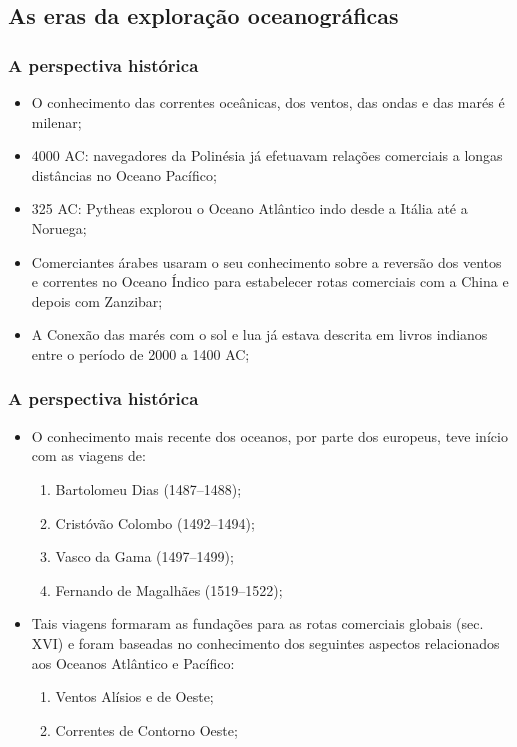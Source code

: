 \subsection{As eras da exploração oceanográficas}
\begin{frame}
\footnotesize{
    \frametitle{A perspectiva histórica}
    \begin{itemize}[<+-| alert@+>]
    \item O conhecimento das correntes oceânicas, dos ventos, das ondas e das
          marés é milenar;
    \item 4000 AC: navegadores da Polinésia já efetuavam relações comerciais a
          longas distâncias no Oceano Pacífico;
    \item 325 AC: Pytheas explorou o Oceano Atlântico indo desde a Itália até a
          Noruega;
    \item Comerciantes árabes usaram o seu conhecimento sobre a reversão dos
          ventos e correntes no Oceano Índico para estabelecer rotas comerciais
          com a China e depois com Zanzibar;
    \item A Conexão das marés com o sol e lua já estava descrita em livros
          indianos entre o período de 2000 a 1400 AC;
    \end{itemize}
}
\end{frame}

\begin{frame}
    \frametitle{A perspectiva histórica}
    \begin{itemize}[<+-| alert@+>]
    \item O conhecimento mais recente dos oceanos, por parte dos europeus, teve
          início com as viagens de:
        \begin{enumerate}[<+-| alert@+>]
            \item Bartolomeu Dias (1487--1488);
            \item Cristóvão Colombo (1492--1494);
            \item Vasco da Gama (1497--1499);
            \item Fernando de Magalhães (1519--1522);
        \end{enumerate}
    \item Tais viagens formaram as fundações para as rotas comerciais globais
          (sec. XVI) e foram baseadas no conhecimento dos seguintes aspectos
          relacionados aos Oceanos Atlântico e Pacífico:
        \begin{enumerate}[<+-| alert@+>]
            \item Ventos Alísios e de Oeste;
            \item Correntes de Contorno Oeste;
                \end{enumerate}
    \end{itemize}
\end{frame}

